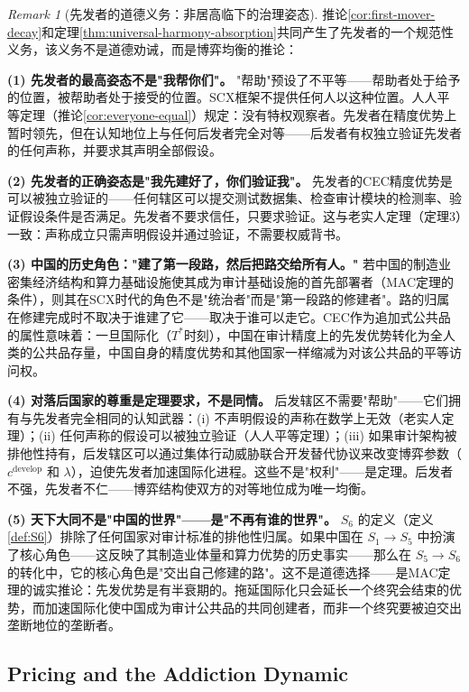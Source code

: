 \documentclass[12pt,a4paper]{ctexart}
\theoremstyle{definition}
\theoremstyle{remark}
\newtheorem{remark}{Remark}[section]
\begin{document}
\begin{remark}[先发者的道德义务：非居高临下的治理姿态]
\label{rem:first-mover-duty}
推论\ref{cor:first-mover-decay}和定理\ref{thm:universal-harmony-absorption}共同产生了先发者的一个规范性义务，该义务不是道德劝诫，而是博弈均衡的推论：

\textbf{(1) 先发者的最高姿态不是"我帮你们"。} "帮助"预设了不平等——帮助者处于给予的位置，被帮助者处于接受的位置。SCX框架不提供任何人以这种位置。人人平等定理（推论\ref{cor:everyone-equal}）规定：没有特权观察者。先发者在精度优势上暂时领先，但在认知地位上与任何后发者完全对等——后发者有权独立验证先发者的任何声称，并要求其声明全部假设。

\textbf{(2) 先发者的正确姿态是"我先建好了，你们验证我"。} 先发者的CEC精度优势是可以被独立验证的——任何辖区可以提交测试数据集、检查审计模块的检测率、验证假设条件是否满足。先发者不要求信任，只要求验证。这与老实人定理（定理3）一致：声称成立只需声明假设并通过验证，不需要权威背书。

\textbf{(3) 中国的历史角色："建了第一段路，然后把路交给所有人。"} 若中国的制造业密集经济结构和算力基础设施使其成为审计基础设施的首先部署者（MAC定理的条件），则其在SCX时代的角色不是"统治者"而是"第一段路的修建者"。路的归属在修建完成时不取决于谁建了它——取决于谁可以走它。CEC作为追加式公共品的属性意味着：一旦国际化（$T^*$时刻），中国在审计精度上的先发优势转化为全人类的公共品存量，中国自身的精度优势和其他国家一样缩减为对该公共品的平等访问权。

\textbf{(4) 对落后国家的尊重是定理要求，不是同情。} 后发辖区不需要"帮助"——它们拥有与先发者完全相同的认知武器：(i) 不声明假设的声称在数学上无效（老实人定理）；(ii) 任何声称的假设可以被独立验证（人人平等定理）；(iii) 如果审计架构被排他性持有，后发辖区可以通过集体行动威胁联合开发替代协议来改变博弈参数（$c^{\text{develop}}$ 和 $\lambda$），迫使先发者加速国际化进程。这些不是"权利"——是定理。后发者不强，先发者不仁——博弈结构使双方的对等地位成为唯一均衡。

\textbf{(5) 天下大同不是"中国的世界"——是"不再有谁的世界"。} $S_6$ 的定义（定义\ref{def:S6}）排除了任何国家对审计标准的排他性归属。如果中国在 $S_1 \to S_5$ 中扮演了核心角色——这反映了其制造业体量和算力优势的历史事实——那么在 $S_5 \to S_6$ 的转化中，它的核心角色是"交出自己修建的路"。这不是道德选择——是MAC定理的诚实推论：先发优势是有半衰期的。拖延国际化只会延长一个终究会结束的优势，而加速国际化使中国成为审计公共品的共同创建者，而非一个终究要被迫交出垄断地位的垄断者。
\end{remark}

\subsection{Pricing and the Addiction Dynamic}
\end{document}
